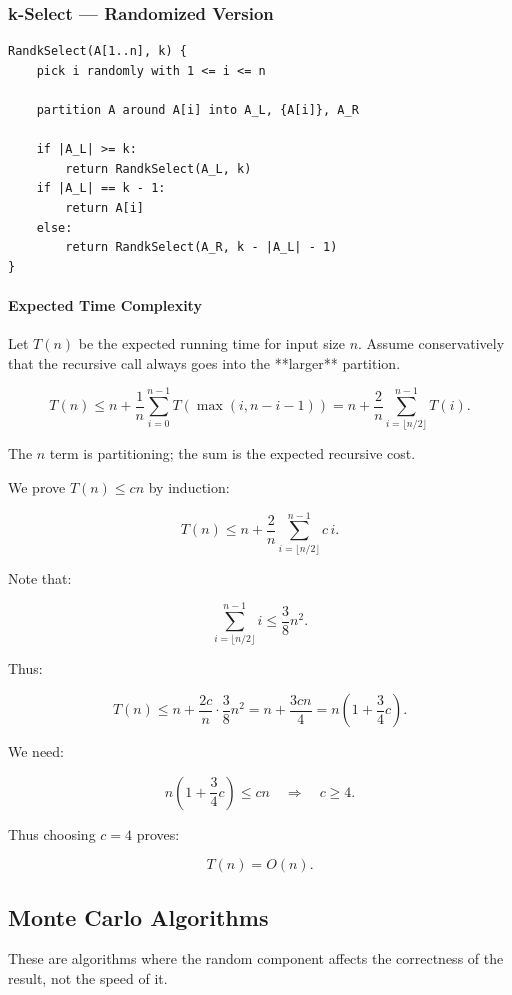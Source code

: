 \documentclass{article}
\begin{document}
\subsubsection{k-Select — Randomized Version}

\begin{verbatim}
RandkSelect(A[1..n], k) {
    pick i randomly with 1 <= i <= n

    partition A around A[i] into A_L, {A[i]}, A_R

    if |A_L| >= k:
        return RandkSelect(A_L, k)
    if |A_L| == k - 1:
        return A[i]
    else:
        return RandkSelect(A_R, k - |A_L| - 1)
}
\end{verbatim}

\paragraph{Expected Time Complexity}

Let $T(n)$ be the expected running time for input size $n$.  
Assume conservatively that the recursive call always goes into the **larger** partition.

\[
T(n) \le n + \frac{1}{n}\sum_{i=0}^{n-1} T(\max(i,n-i-1))
      = n + \frac{2}{n}\sum_{i=\lfloor n/2 \rfloor}^{n-1} T(i).
\]

The $n$ term is partitioning; the sum is the expected recursive cost.

We prove $T(n) \le cn$ by induction:

\[
T(n) \le n + \frac{2}{n}\sum_{i=\lfloor n/2 \rfloor}^{n-1} c\, i.
\]

Note that:

\[
\sum_{i=\lfloor n/2 \rfloor}^{n-1} i \le \frac{3}{8}n^2.
\]

Thus:

\[
T(n) \le n + \frac{2c}{n}\cdot \frac{3}{8}n^2
      = n + \frac{3cn}{4}
      = n\!\left(1 + \frac{3}{4}c\right).
\]

We need:

\[
n\!\left(1 + \frac{3}{4}c\right) \le cn
\quad\Longrightarrow\quad
c \ge 4.
\]

Thus choosing $c = 4$ proves:

\[
T(n) = O(n).
\]

\subsection{Monte Carlo Algorithms}
These are algorithms where the random component affects the correctness of the result, not the speed of it.
\end{document}

